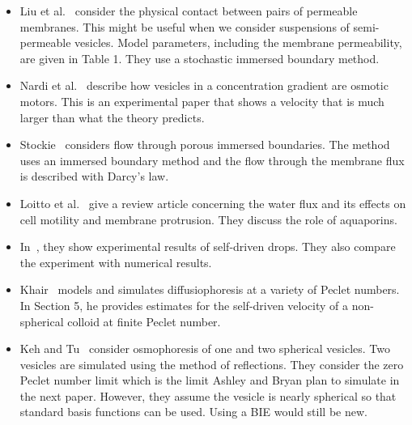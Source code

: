 \documentclass[twoside,twocolumn,9pt]{article}
\begin{document}
\begin{itemize}
  \item Liu et al.~\cite{liu-chu-new-rea-low-all2019} consider the
    physical contact between pairs of permeable membranes. This might be
    useful when we consider suspensions of semi-permeable vesicles.
    Model parameters, including the membrane permeability, are given in
    Table 1. They use a stochastic immersed boundary method.

  \item Nardi et al.~\cite{nar-bru-sac1999} describe how vesicles in a
    concentration gradient are osmotic motors. This is an experimental
    paper that shows a velocity that is much larger than what the theory
    predicts.

  \item Stockie~\cite{sto2009} considers flow through porous immersed
    boundaries. The method uses an immersed boundary method and the flow
    through the membrane flux is described with Darcy's law.

  \item Loitto et al.~\cite{loi-kar-mag2009} give a review article
    concerning the water flux and its effects on cell motility and
    membrane protrusion. They discuss the role of aquaporins.

  \item In~\cite{tha-kum-mad-pul2006}, they show experimental results of
    self-driven drops. They also compare the experiment with numerical
    results.

  \item Khair~\cite{kha2013} models and simulates diffusiophoresis at a
    variety of Peclet numbers. In Section 5, he provides estimates for
    the self-driven velocity of a non-spherical colloid at finite Peclet
    number.

  \item Keh and Tu~\cite{keh-tu2000} consider osmophoresis of one and
    two spherical vesicles.  Two vesicles are simulated using the method
    of reflections. They consider the zero Peclet number limit which is
    the limit Ashley and Bryan plan to simulate in the next paper.
    However, they assume the vesicle is nearly spherical so that
    standard basis functions can be used. Using a BIE would still be
    new.








\end{itemize}

\end{document}
